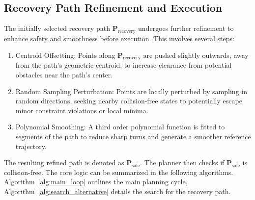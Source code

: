\subsection{Recovery Path Refinement and Execution}
The initially selected recovery path \( \mathbf{P}_{\text{recovery}} \) undergoes further refinement to enhance safety and smoothness before execution. This involves several steps:
\begin{enumerate}
    \item Centroid Offsetting: Points along \( \mathbf{P}_{\text{recovery}} \) are pushed slightly outwards, away from the path's geometric centroid, to increase clearance from potential obstacles near the path's center.
    \item Random Sampling Perturbation: Points are locally perturbed by sampling in random directions, seeking nearby collision-free states to potentially escape minor constraint violations or local minima.
    \item Polynomial Smoothing: A third order polynomial function is fitted to segments of the path to reduce sharp turns and generate a  smoother reference trajectory.
\end{enumerate}
The resulting refined path is denoted as \( \mathbf{P}_{\text{safe}} \). The planner then checks if \( \mathbf{P}_{\text{safe}} \) is collision-free. The core logic can be summarized in the following algorithms. Algorithm~\ref{alg:main_loop} outlines the main planning cycle, Algorithm~\ref{alg:search_alternative} details the search for the recovery path.



























